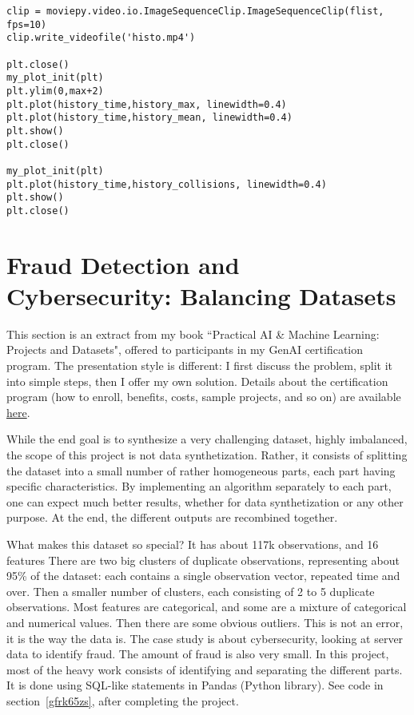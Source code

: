 \documentclass[oneside,10pt]{book}
\begin{document}
\begin{lstlisting}
clip = moviepy.video.io.ImageSequenceClip.ImageSequenceClip(flist, fps=10)
clip.write_videofile('histo.mp4')

plt.close()
my_plot_init(plt)
plt.ylim(0,max+2)
plt.plot(history_time,history_max, linewidth=0.4)
plt.plot(history_time,history_mean, linewidth=0.4)
plt.show()
plt.close()

my_plot_init(plt)
plt.plot(history_time,history_collisions, linewidth=0.4)
plt.show()
plt.close()
\end{lstlisting}



\section{Fraud Detection and Cybersecurity: Balancing Datasets}\label{g0n2fd}

This section is an extract from my book ``Practical AI \& Machine Learning: Projects and Datasets", offered to participants in my GenAI
 certification program. The presentation style is different: I first discuss the problem, split it into simple steps, then I offer my own solution.
Details about the certification program (how to enroll, benefits, costs, sample projects, and so on) are available \href{https://mltblog.com/3pWxvZK}{here}.

While the end goal is to synthesize a very challenging dataset, highly imbalanced, the scope of this project is not data synthetization.
 Rather, it consists of splitting the dataset into a small number of rather homogeneous parts, each part having specific characteristics.
 By implementing an  algorithm separately to each part, one can expect much better results, whether for data synthetization or any other purpose. At the end, the different outputs are recombined together.

What makes this dataset so special? It has about 117k observations, and 16 features There are two big clusters of duplicate observations, representing
about 95\% of the dataset: each contains a single observation vector, repeated time and over.  Then a smaller number of clusters, each consisting of 2 to 5 duplicate observations.
Most features are categorical, and some are a mixture of categorical and numerical values. Then there are some obvious outliers.
This is not an error, it is the way the data is. The case study is about cybersecurity, looking at server data to identify fraud. The amount of fraud is also very small. In this project, most of the heavy work consists of identifying and separating the different parts.
 It is done using SQL-like statements in \textcolor{index}{Pandas} (Python library). See code in section~\ref{gfrk65zs},
 after completing the project.
\end{document}
